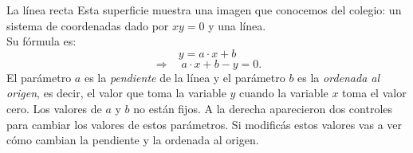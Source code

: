 \begin{surferPage}{La l\'inea recta}
Esta superficie muestra una imagen que conocemos del colegio: un sistema de coordenadas dado por $xy=0$  y una l\'inea.\\
Su f\'ormula es:
\[y=a\cdot x + b\]
\[ \Rightarrow \quad a\cdot x +b -y=0.\]
El par\'ametro $a$ es la {\it pendiente} de la l\'inea y el par\'ametro $b$ es la {\it ordenada al origen}, es decir, el valor que toma la variable $y$ cuando la variable $x$ toma el valor cero.
\newline \newline
Los valores de $a$ y $b$ no est\'an fijos. A la derecha aparecieron dos controles para cambiar los valores de estos par\'ametros. Si modific\'as estos valores vas a ver c\'omo cambian la pendiente y la ordenada al origen.
\end{surferPage}

